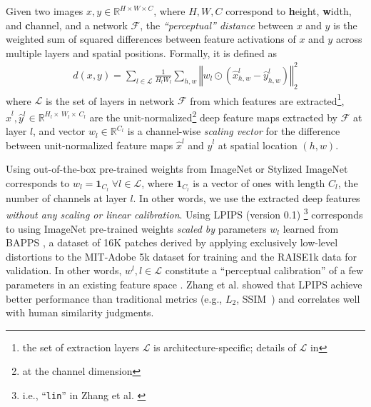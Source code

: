 \documentclass[sigconf]{acmart}
\begin{document}
Given two images $x, y \in \mathbb{R}^{H \times W \times C}$, where $H, W, C$ correspond to \textbf{h}eight, \textbf{w}idth, and \textbf{c}hannel, and a network $\mathcal{F}$, the \textit{``perceptual'' distance} between $x$ and $y$ is the weighted sum of squared differences between feature activations of $x$ and $y$ across multiple layers and spatial positions. Formally, it is defined as 
\begin{align}
    d(x, y) = \sum_{l \in \mathcal{L}} \frac{1}{H_l W_l} \sum_{h, w} \left \Vert w_l \odot \left(\hat{x}_{h, w}^l - \hat{y}_{h, w}^l \right) \right \Vert_2^2 
    \label{eq:distance_function}
\end{align}
where $\mathcal{L}$ is the set of layers in network  $\mathcal{F}$ from which features are extracted\footnote{the set of extraction layers $\mathcal{L}$ is architecture-specific; details of  $\mathcal{L}$ in }, $\hat{x}^l, \hat{y}^l \in \mathbb{R}^{H_l \times \, W_l \times \, C_l}$ are the unit-normalized\footnote{at the channel dimension} deep feature maps extracted by $\mathcal{F}$ at layer $l$, and vector $w_l \in \mathbb{R}^{C_l}$ is a channel-wise \textit{scaling vector} for the difference between unit-normalized feature maps $\hat{x}^l$ and $\hat{y}^l$ at spatial location $(h, w)$. 

Using out-of-the-box pre-trained weights from ImageNet or Stylized ImageNet corresponds to $w_l = \mathbf{1}_{C_l} \; \forall l \in \mathcal{L}$, where $\mathbf{1}_{C_l}$ is a vector of ones with length $C_l$, the number of channels at layer $l$. In other words, we use the extracted deep features \textit{without any scaling or linear calibration}. 
Using LPIPS (version 0.1) \footnote{i.e., ``\texttt{lin}'' in Zhang et al. \cite{zhangUnreasonableEffectivenessDeep2018}} corresponds to using ImageNet pre-trained weights \textit{scaled by} parameters $w_l$ learned from BAPPS \cite{zhangUnreasonableEffectivenessDeep2018}, a dataset of 16K patches derived by applying exclusively low-level distortions to the MIT-Adobe 5k dataset \cite{bychkovsky2011learning} for training and the RAISE1k data \cite{dang2015raise} for validation. In other words, $w^l, l \in \mathcal{L}$ constitute a ``perceptual calibration'' of a few parameters in an existing feature space \cite{zhangUnreasonableEffectivenessDeep2018}. Zhang et al. \cite{zhangUnreasonableEffectivenessDeep2018} showed that LPIPS achieve better performance than traditional metrics (e.g., $L_2$, SSIM~\cite{wang2003multiscale}) and correlates well with human similarity judgments.
\end{document}
